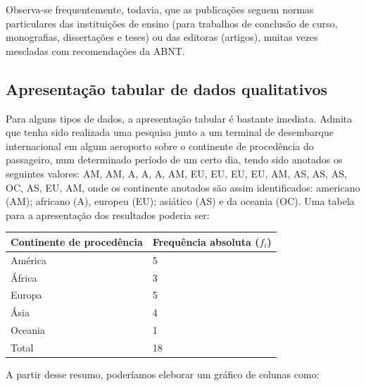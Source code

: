 \documentclass[
]{book}
\begin{document}
Observa-se frequentemente, todavia, que as publicações seguem normas particulares das instituições de ensino (para trabalhos de conclusão de curso, monografias, dissertações e teses) ou das editoras (artigos), muitas vezes mescladas com recomendações da ABNT.

\hfill\break

\hypertarget{apresentauxe7uxe3o-tabular-de-dados-qualitativos}{%
\subsection{Apresentação tabular de dados qualitativos}\label{apresentauxe7uxe3o-tabular-de-dados-qualitativos}}

\hfill\break

Para alguns tipos de dados, a apresentação tabular é bastante imediata. Admita que tenha sido realizada uma pesquisa junto a um terminal de desembarque internacional em algum aeroporto sobre o continente de procedência do passageiro, num determinado período de um certo dia, tendo sido anotados os seguintes valores: AM, AM, A, A, A, AM, EU, EU, EU, EU, AM, AS, AS, AS, OC, AS, EU, AM, onde os continente anotados são assim identificados: americano (AM); africano (A), europeu (EU); asiático (AS) e da oceania (OC). Uma tabela para a apresentação dos resultados poderia ser:

\hfill\break

\begin{longtable}[]{@{}ll@{}}
\toprule()
Continente de procedência & Frequência absoluta (\(f_{i}\)) \\
\midrule()
\endhead
América & 5 \\
África & 3 \\
Europa & 5 \\
Ásia & 4 \\
Oceania & 1 \\
Total & 18 \\
\bottomrule()
\end{longtable}

\hfill\break

A partir desse resumo, poderíamos eleborar um gráfico de colunas como:

\hfill\break
\end{document}
